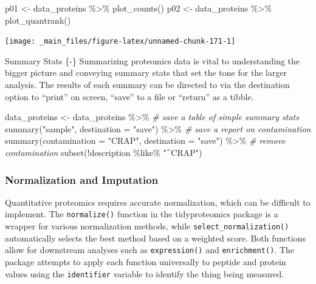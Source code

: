 \documentclass[
]{book}
\newenvironment{Shaded}{\begin{snugshade}}{\end{snugshade}}
\newcommand{\AttributeTok}[1]{\textcolor[rgb]{0.77,0.63,0.00}{#1}}
\newcommand{\CommentTok}[1]{\textcolor[rgb]{0.56,0.35,0.01}{\textit{#1}}}
\newcommand{\FunctionTok}[1]{\textcolor[rgb]{0.00,0.00,0.00}{#1}}
\newcommand{\NormalTok}[1]{#1}
\newcommand{\OtherTok}[1]{\textcolor[rgb]{0.56,0.35,0.01}{#1}}
\newcommand{\SpecialCharTok}[1]{\textcolor[rgb]{0.00,0.00,0.00}{#1}}
\newcommand{\StringTok}[1]{\textcolor[rgb]{0.31,0.60,0.02}{#1}}
\begin{document}
\begin{Shaded}
\begin{Highlighting}[]
\NormalTok{p01 }\OtherTok{\textless{}{-}}\NormalTok{ data\_proteins }\SpecialCharTok{\%\textgreater{}\%} \FunctionTok{plot\_counts}\NormalTok{()}
\NormalTok{p02 }\OtherTok{\textless{}{-}}\NormalTok{ data\_proteins }\SpecialCharTok{\%\textgreater{}\%} \FunctionTok{plot\_quantrank}\NormalTok{()}
\end{Highlighting}
\end{Shaded}

\begin{center}\texttt{[image: \_main\_files/figure-latex/unnamed-chunk-171-1]} \end{center}

Summary Stats \{-\}
Summarizing proteomics data is vital to understanding the bigger picture and conveying summary stats that set the tone for the larger analysis. The results of each summary can be directed to via the destination option to ``print'' on screen, ``save'' to a file or ``return'' as a tibble.

\begin{Shaded}
\begin{Highlighting}[]
\NormalTok{data\_proteins }\OtherTok{\textless{}{-}}\NormalTok{ data\_proteins }\SpecialCharTok{\%\textgreater{}\%}
  \CommentTok{\# save a table of simple summary stats}
  \FunctionTok{summary}\NormalTok{(}\StringTok{"sample"}\NormalTok{, }\AttributeTok{destination =} \StringTok{"save"}\NormalTok{) }\SpecialCharTok{\%\textgreater{}\%}
  \CommentTok{\# save a report on contamination}
  \FunctionTok{summary}\NormalTok{(}\AttributeTok{contamination =} \StringTok{"CRAP"}\NormalTok{, }\AttributeTok{destination =} \StringTok{"save"}\NormalTok{) }\SpecialCharTok{\%\textgreater{}\%}
  \CommentTok{\# remove contamination}
  \FunctionTok{subset}\NormalTok{(}\SpecialCharTok{!}\NormalTok{description }\SpecialCharTok{\%like\%} \StringTok{"\^{}CRAP"}\NormalTok{)}
\end{Highlighting}
\end{Shaded}

\hypertarget{normalization-and-imputation}{%
\subsubsection*{Normalization and Imputation}\label{normalization-and-imputation}}

Quantitative proteomics requires accurate normalization, which can be difficult to implement. The \texttt{normalize()} function in the tidyproteomics package is a wrapper for various normalization methods, while \texttt{select\_normalization()} automatically selects the best method based on a weighted score. Both functions allow for downstream analyses such as \texttt{expression()} and \texttt{enrichment()}. The package attempts to apply each function universally to peptide and protein values using the \texttt{identifier} variable to identify the thing being measured.
\end{document}
